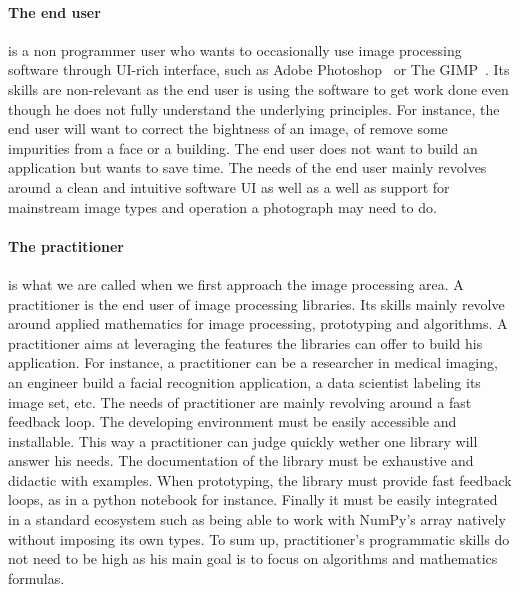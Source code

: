 \paragraph{The end user} is a non programmer user who wants to occasionally use image processing software through
UI-rich interface, such as Adobe Photoshop~\parencite{adobe.2019.photoshop} or The GIMP~\parencite{gimp.2019}. Its
skills are non-relevant as the end user is using the software to get work done even though he does not fully understand
the underlying principles. For instance, the end user will want to correct the bightness of an image, of remove some
impurities from a face or a building. The end user does not want to build an application but wants to save time. The
needs of the end user mainly revolves around a clean and intuitive software UI as well as a well as support for
mainstream image types and operation a photograph may need to do.

\paragraph{The practitioner} is what we are called when we first approach the image processing area. A practitioner is
the end user of image processing libraries. Its skills mainly revolve around applied mathematics for image processing,
prototyping and algorithms. A practitioner aims at leveraging the features the libraries can offer to build his
application. For instance, a practitioner can be a researcher in medical imaging, an engineer build a facial recognition
application, a data scientist labeling its image set, etc. The needs of practitioner are mainly revolving around a fast
feedback loop. The developing environment must be easily accessible and installable. This way a practitioner can judge
quickly wether one library will answer his needs. The documentation of the library must be exhaustive and didactic with
examples. When prototyping, the library must provide fast feedback loops, as in a python notebook for instance. Finally
it must be easily integrated in a standard ecosystem such as being able to work with NumPy's array natively without
imposing its own types. To sum up, practitioner's programmatic skills do not need to be high as his main goal is to
focus on algorithms and mathematics formulas.

